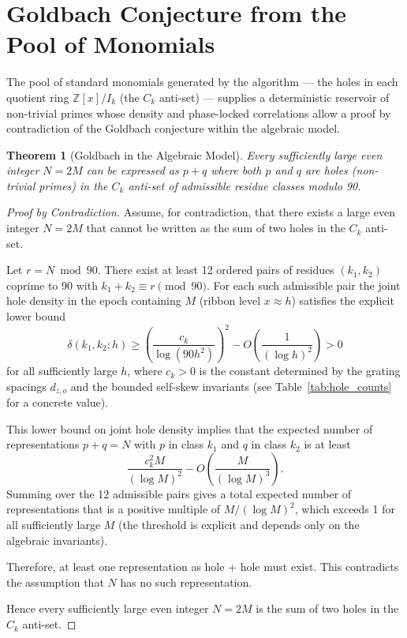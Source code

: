 \documentclass[11pt,a4paper]{article}
\newtheorem{theorem}{Theorem} %
\begin{document}
\section{Goldbach Conjecture from the Pool of Monomials}
\label{sec:goldbach}

The pool of standard monomials generated by the algorithm — the holes in each quotient ring \(\mathbb{Z}[x]/I_k\) (the \(C_k\) anti-set) — supplies a deterministic reservoir of non-trivial primes whose density and phase-locked correlations allow a proof by contradiction of the Goldbach conjecture within the algebraic model.

\begin{theorem}[Goldbach in the Algebraic Model]
Every sufficiently large even integer \(N=2M\) can be expressed as \(p+q\) where both \(p\) and \(q\) are holes (non-trivial primes) in the \(C_k\) anti-set of admissible residue classes modulo 90.
\end{theorem}

\begin{proof}[Proof by Contradiction]
Assume, for contradiction, that there exists a large even integer \(N=2M\) that cannot be written as the sum of two holes in the \(C_k\) anti-set.

Let \(r=N\bmod 90\). There exist at least 12 ordered pairs of residues \((k_1,k_2)\) coprime to 90 with \(k_1+k_2\equiv r\pmod{90}\). For each such admissible pair the joint hole density in the epoch containing \(M\) (ribbon level \(x\approx h\)) satisfies the explicit lower bound
\[
\delta(k_1,k_2;h)\ge\left(\frac{c_k}{\log(90h^2)}\right)^2 - O\left(\frac{1}{(\log h)^2}\right)>0
\]
for all sufficiently large \(h\), where \(c_k>0\) is the constant determined by the grating spacings \(d_{z,o}\) and the bounded self-skew invariants (see Table~\ref{tab:hole_counts} for a concrete value).

This lower bound on joint hole density implies that the expected number of representations \(p+q=N\) with \(p\) in class \(k_1\) and \(q\) in class \(k_2\) is at least
\[
\frac{c_k^2 M}{(\log M)^2} - O\left(\frac{M}{(\log M)^3}\right).
\]
Summing over the 12 admissible pairs gives a total expected number of representations that is a positive multiple of \(M/(\log M)^2\), which exceeds 1 for all sufficiently large \(M\) (the threshold is explicit and depends only on the algebraic invariants).

Therefore, at least one representation as hole + hole must exist. This contradicts the assumption that \(N\) has no such representation.

Hence every sufficiently large even integer \(N=2M\) is the sum of two holes in the \(C_k\) anti-set.
\end{proof}
\end{document}
